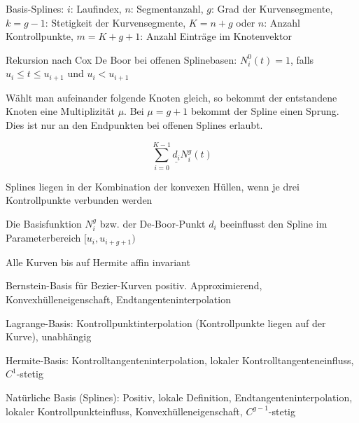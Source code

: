 \documentclass[12pt,landscape]{article}
\begin{document}
\begin{multicols}{3}
\begin{compactitem}
\item Basis-Splines: $i$: Laufindex, $n$: Segmentanzahl, $g$: Grad der Kurvensegmente, $k=g-1$: Stetigkeit der Kurvensegmente, $K=n+g$ oder $n$: Anzahl Kontrollpunkte, $m=K+g+1$: Anzahl Einträge im Knotenvektor
\item Rekursion nach Cox De Boor bei offenen Splinebasen:
$N^0_i(t) = 1$, falls $u_i \leq t \leq u_{i+1}$ und $u_i < u_{i+1}$
\item Wählt man aufeinander folgende Knoten gleich, so bekommt der entstandene Knoten eine Multiplizität $\mu$. Bei $\mu = g + 1$ bekommt der Spline einen Sprung. Dies ist nur an den Endpunkten bei offenen Splines erlaubt.
\item \[
\sum_{i=0}^{K-1} \underline{d_i} N_i^g(t)
\]
\item Splines liegen in der Kombination der konvexen Hüllen, wenn je drei Kontrollpunkte verbunden werden
\item Die Basisfunktion $N_i^g$ bzw. der De-Boor-Punkt $d_i$ beeinflusst den Spline im Parameterbereich $[u_i,u_{i+g+1})$
\item Alle Kurven bis auf Hermite affin invariant
\item Bernstein-Basis für Bezier-Kurven positiv. Approximierend, Konvexhülleneigenschaft, Endtangenteninterpolation
\item Lagrange-Basis: Kontrollpunktinterpolation (Kontrollpunkte liegen auf der Kurve), unabhängig
\item Hermite-Basis: Kontrolltangenteninterpolation, lokaler Kontrolltangenteneinfluss, $C^1$-stetig
\item Natürliche Basis (Splines): Positiv, lokale Definition, Endtangenteninterpolation, lokaler Kontrollpunkteinfluss, Konvexhülleneigenschaft, $C^{g-1}$-stetig
\end{compactitem}

\end{multicols}
\end{document}
